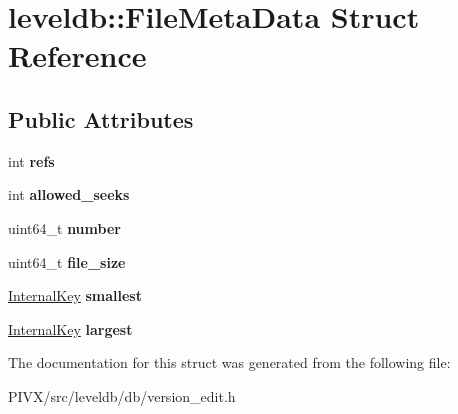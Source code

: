 \hypertarget{structleveldb_1_1_file_meta_data}{}\section{leveldb\+:\+:File\+Meta\+Data Struct Reference}
\label{structleveldb_1_1_file_meta_data}
\subsection*{Public Attributes}
\begin{DoxyCompactItemize}
\item 
\mbox{\label{structleveldb_1_1_file_meta_data_a199e4ba2167c8facad8bd41269982935}} 
int {\bfseries refs}
\item 
\mbox{\label{structleveldb_1_1_file_meta_data_a63f9a0149290c7b22bbc871da6b4f619}} 
int {\bfseries allowed\+\_\+seeks}
\item 
\mbox{\label{structleveldb_1_1_file_meta_data_adc63bac3e06fd4387ebb9f085fc88fe7}} 
uint64\+\_\+t {\bfseries number}
\item 
\mbox{\label{structleveldb_1_1_file_meta_data_a778ea9c773ad4fdfe4408eecaae754f7}} 
uint64\+\_\+t {\bfseries file\+\_\+size}
\item 
\mbox{\label{structleveldb_1_1_file_meta_data_a9e5e5c149495aede836ac637cd89269f}} 
\mbox{\hyperlink{classleveldb_1_1_internal_key}{Internal\+Key}} {\bfseries smallest}
\item 
\mbox{\label{structleveldb_1_1_file_meta_data_a410718ba1868392b298d05a774dd07d1}} 
\mbox{\hyperlink{classleveldb_1_1_internal_key}{Internal\+Key}} {\bfseries largest}
\end{DoxyCompactItemize}


The documentation for this struct was generated from the following file\+:\begin{DoxyCompactItemize}
\item 
P\+I\+V\+X/src/leveldb/db/version\+\_\+edit.\+h\end{DoxyCompactItemize}
